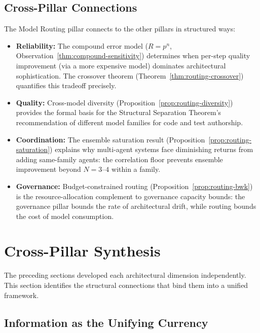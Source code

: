 \documentclass[11pt, a4paper]{googledeepmind}
\begin{document}
\subsection{Cross-Pillar Connections}

The Model Routing pillar connects to the other pillars in structured ways:

\begin{itemize}[nosep]
\item \textbf{Reliability:} The compound error model ($R = p^n$, Observation~\ref{thm:compound-sensitivity}) determines when per-step quality improvement (via a more expensive model) dominates architectural sophistication. The crossover theorem (Theorem~\ref{thm:routing-crossover}) quantifies this tradeoff precisely.
\item \textbf{Quality:} Cross-model diversity (Proposition~\ref{prop:routing-diversity}) provides the formal basis for the Structural Separation Theorem's recommendation of different model families for code and test authorship.
\item \textbf{Coordination:} The ensemble saturation result (Proposition~\ref{prop:routing-saturation}) explains why multi-agent systems face diminishing returns from adding same-family agents: the correlation floor prevents ensemble improvement beyond $N = 3$--$4$ within a family.
\item \textbf{Governance:} Budget-constrained routing (Proposition~\ref{prop:routing-bwk}) is the resource-allocation complement to governance capacity bounds: the governance pillar bounds the rate of architectural drift, while routing bounds the cost of model consumption.
\end{itemize}


\section{Cross-Pillar Synthesis}
\label{sec:synthesis}

The preceding sections developed each architectural dimension independently. This section identifies the structural connections that bind them into a unified framework.

\subsection{Information as the Unifying Currency}
\end{document}
